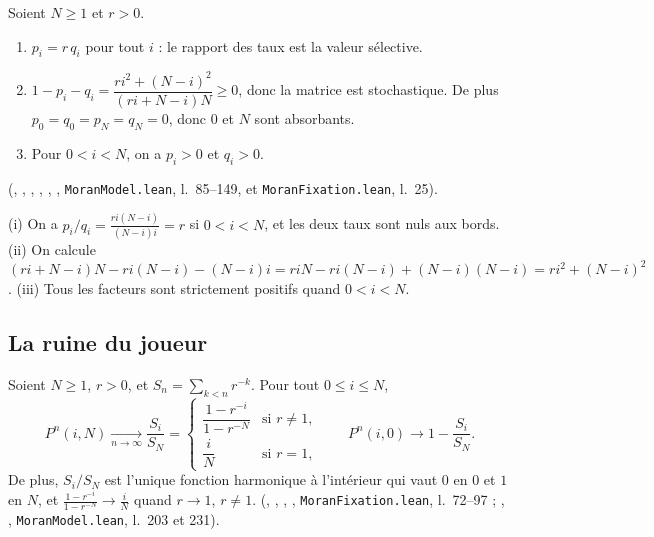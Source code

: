 \begin{lemma}\label{ch4:lem:moranbase}
Soient $N\ge1$ et $r>0$.
\begin{enumerate}[label=(\roman*),itemsep=1pt]
\item $p_i=r\,q_i$ pour tout $i$ : le rapport des taux est la valeur sélective.
\item $1-p_i-q_i=\dfrac{ri^2+(N-i)^2}{(ri+N-i)N}\ge0$, donc la matrice est stochastique. De plus
$p_0=q_0=p_N=q_N=0$, donc $0$ et $N$ sont absorbants.
\item Pour $0<i<N$, on a $p_i>0$ et $q_i>0$.
\end{enumerate}
\tierA{} (, , , ,
, , \texttt{MoranModel.lean}, l.~85--149, et
\texttt{MoranFixation.lean}, l.~25).
\end{lemma}

\begin{humanproof}
(i) On a $p_i/q_i=\frac{ri(N-i)}{(N-i)i}=r$ si $0<i<N$, et les deux taux sont nuls aux bords.
(ii) On calcule
$(ri+N-i)N-ri(N-i)-(N-i)i=riN-ri(N-i)+(N-i)(N-i)=ri^2+(N-i)^2$.
(iii) Tous les facteurs sont strictement positifs quand $0<i<N$.
\end{humanproof}

\subsection{La ruine du joueur}

\begin{theorem}\label{ch4:thm:moran}
Soient $N\ge1$, $r>0$, et $S_n=\sum_{k<n}r^{-k}$. Pour tout $0\le i\le N$,
\[
P^n(i,N)\xrightarrow[n\to\infty]{}\frac{S_i}{S_N}=
\begin{cases}\dfrac{1-r^{-i}}{1-r^{-N}}&\text{si }r\ne1,\\[2mm] \dfrac iN&\text{si }r=1,\end{cases}
\qquad P^n(i,0)\longrightarrow1-\frac{S_i}{S_N}.
\]
De plus, $S_i/S_N$ est l'unique fonction harmonique à l'intérieur qui vaut $0$ en $0$ et $1$ en $N$, et
$\frac{1-r^{-i}}{1-r^{-N}}\to\frac iN$ quand $r\to1$, $r\ne1$. \tierA{} (,
, , ,
\texttt{MoranFixation.lean}, l.~72--97 ; , ,
\texttt{MoranModel.lean}, l.~203 et 231).
\end{theorem}

